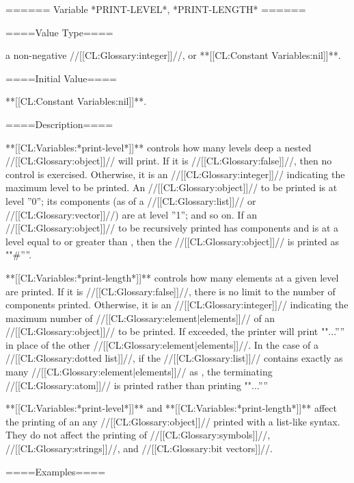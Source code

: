 ====== Variable *PRINT-LEVEL*, *PRINT-LENGTH* ======

====Value Type====

a non-negative //[[CL:Glossary:integer]]//, or **[[CL:Constant Variables:nil]]**.

====Initial Value====

**[[CL:Constant Variables:nil]]**.

====Description====

**[[CL:Variables:*print-level*]]** controls how many levels deep a nested //[[CL:Glossary:object]]// will print. If it is //[[CL:Glossary:false]]//, then no control is exercised. Otherwise, it is an //[[CL:Glossary:integer]]// indicating the maximum level to be printed. An //[[CL:Glossary:object]]// to be printed is at level ''0''; its components (as of a //[[CL:Glossary:list]]// or //[[CL:Glossary:vector]]//) are at level ''1''; and so on. If an //[[CL:Glossary:object]]// to be recursively printed has components and is at a level equal to or greater than , then the //[[CL:Glossary:object]]// is printed as ""#''''.

**[[CL:Variables:*print-length*]]** controls how many elements at a given level are printed. If it is //[[CL:Glossary:false]]//, there is no limit to the number of components printed. Otherwise, it is an //[[CL:Glossary:integer]]// indicating the maximum number of //[[CL:Glossary:element|elements]]// of an //[[CL:Glossary:object]]// to be printed. If exceeded, the printer will print ""...'''' in place of the other //[[CL:Glossary:element|elements]]//. In the case of a //[[CL:Glossary:dotted list]]//, if the //[[CL:Glossary:list]]// contains exactly as many //[[CL:Glossary:element|elements]]// as , the terminating //[[CL:Glossary:atom]]// is printed rather than printing ""...''''

**[[CL:Variables:*print-level*]]** and **[[CL:Variables:*print-length*]]** affect the printing of an any //[[CL:Glossary:object]]// printed with a list-like syntax. They do not affect the printing of //[[CL:Glossary:symbols]]//, //[[CL:Glossary:strings]]//, and //[[CL:Glossary:bit vectors]]//.

====Examples====

